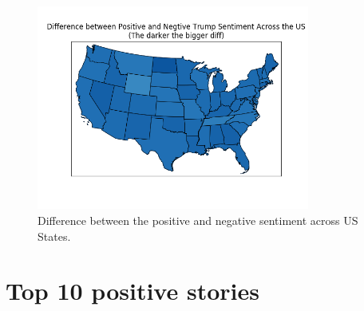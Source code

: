 \documentclass[12pt]{article}
\begin{document}
\begin{figure}[!h]
     \begin{center}
                  \includegraphics[width=0.8\textwidth]{../plots/part3.png}
    \end{center}
    \caption{%
       Difference between the positive and negative sentiment across US States.
     }%
     \label {fig:4}
 \end{figure}
 
\newpage  
\section{Top 10 positive stories}
 
\end{document}
